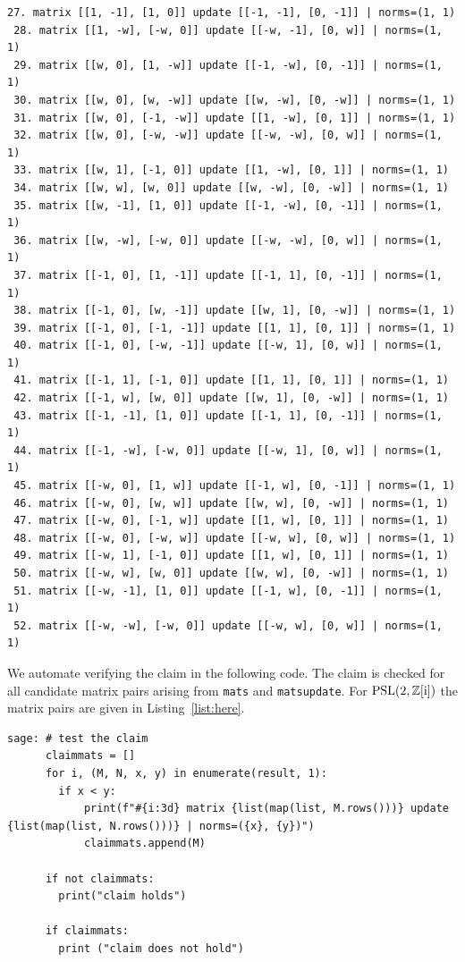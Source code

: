 \documentclass[runningheads]{llncs}
\begin{document}
\begin{lstlisting}[caption={Output candidate matrices, update matrices, and their respective norms. \label{list:here}}]
 27. matrix [[1, -1], [1, 0]] update [[-1, -1], [0, -1]] | norms=(1, 1)
 28. matrix [[1, -w], [-w, 0]] update [[-w, -1], [0, w]] | norms=(1, 1)
 29. matrix [[w, 0], [1, -w]] update [[-1, -w], [0, -1]] | norms=(1, 1)
 30. matrix [[w, 0], [w, -w]] update [[w, -w], [0, -w]] | norms=(1, 1)
 31. matrix [[w, 0], [-1, -w]] update [[1, -w], [0, 1]] | norms=(1, 1)
 32. matrix [[w, 0], [-w, -w]] update [[-w, -w], [0, w]] | norms=(1, 1)
 33. matrix [[w, 1], [-1, 0]] update [[1, -w], [0, 1]] | norms=(1, 1)
 34. matrix [[w, w], [w, 0]] update [[w, -w], [0, -w]] | norms=(1, 1)
 35. matrix [[w, -1], [1, 0]] update [[-1, -w], [0, -1]] | norms=(1, 1)
 36. matrix [[w, -w], [-w, 0]] update [[-w, -w], [0, w]] | norms=(1, 1)
 37. matrix [[-1, 0], [1, -1]] update [[-1, 1], [0, -1]] | norms=(1, 1)
 38. matrix [[-1, 0], [w, -1]] update [[w, 1], [0, -w]] | norms=(1, 1)
 39. matrix [[-1, 0], [-1, -1]] update [[1, 1], [0, 1]] | norms=(1, 1)
 40. matrix [[-1, 0], [-w, -1]] update [[-w, 1], [0, w]] | norms=(1, 1)
 41. matrix [[-1, 1], [-1, 0]] update [[1, 1], [0, 1]] | norms=(1, 1)
 42. matrix [[-1, w], [w, 0]] update [[w, 1], [0, -w]] | norms=(1, 1)
 43. matrix [[-1, -1], [1, 0]] update [[-1, 1], [0, -1]] | norms=(1, 1)
 44. matrix [[-1, -w], [-w, 0]] update [[-w, 1], [0, w]] | norms=(1, 1)
 45. matrix [[-w, 0], [1, w]] update [[-1, w], [0, -1]] | norms=(1, 1)
 46. matrix [[-w, 0], [w, w]] update [[w, w], [0, -w]] | norms=(1, 1)
 47. matrix [[-w, 0], [-1, w]] update [[1, w], [0, 1]] | norms=(1, 1)
 48. matrix [[-w, 0], [-w, w]] update [[-w, w], [0, w]] | norms=(1, 1)
 49. matrix [[-w, 1], [-1, 0]] update [[1, w], [0, 1]] | norms=(1, 1)
 50. matrix [[-w, w], [w, 0]] update [[w, w], [0, -w]] | norms=(1, 1)
 51. matrix [[-w, -1], [1, 0]] update [[-1, w], [0, -1]] | norms=(1, 1)
 52. matrix [[-w, -w], [-w, 0]] update [[-w, w], [0, w]] | norms=(1, 1)

\end{lstlisting}

We automate verifying the claim in the following code.  The claim is checked for all candidate matrix pairs arising from \texttt{mats} and \texttt{matsupdate}.  For \(\operatorname{PSL}(2,\mathbb{Z}[\mathrm{i}])\) the matrix pairs are given in Listing~\ref{list:here}.
\begin{lstlisting}
sage: # test the claim
      claimmats = []
      for i, (M, N, x, y) in enumerate(result, 1):
        if x < y:
            print(f"#{i:3d} matrix {list(map(list, M.rows()))} update {list(map(list, N.rows()))} | norms=({x}, {y})")
            claimmats.append(M)  
        
      if not claimmats:
        print("claim holds")
    
      if claimmats:
        print ("claim does not hold")
\end{lstlisting}
\end{document}
